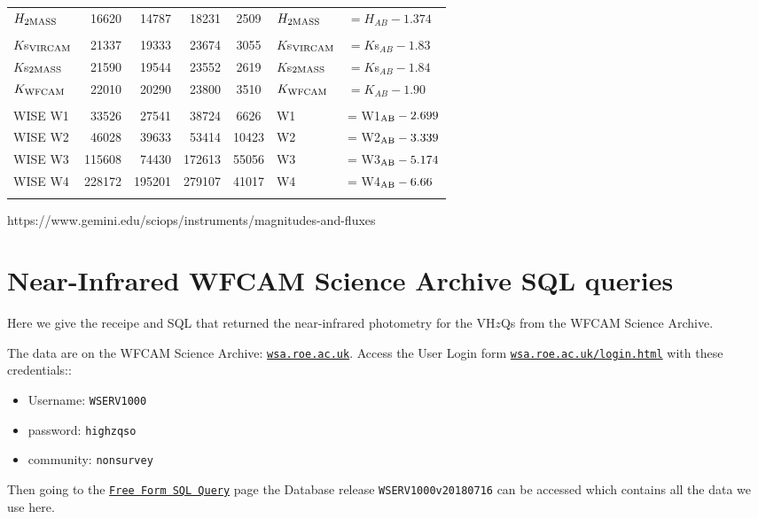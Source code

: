 \documentclass[usenatbib]{mnras}
\begin{document}
\begin{table*}
\begin{center}
\begin{tabular}{l r r r  c l l}
      $H_{\rm 2MASS}$      & 16620        & 	14787  &   18231   & 2509      & $H_{\rm 2MASS}$      & $= H_{AB}  - 1.374 $        \\
      &&&&&&\\
      $K$s$_{\rm VIRCAM}$     &    21337    &    19333  &    23674   &   3055     & $K$s$_{\rm VIRCAM}$      & $ = K$s$_{AB} - 1.83  $          \\ 
      $K$s$_{\rm 2MASS}$     &   21590    & 	19544  &   23552        &   2619      & $K$s$_{\rm 2MASS}$      & $ = K$s$_{AB} -  1.84  $          \\ 
      $K_{\rm WFCAM}$     &    22010     &    20290 &    23800         &   3510          & $K_{\rm WFCAM}$     & $ = K_{AB} - 1.90  $          \\ 
      &&&&&&\\
      WISE W1               &    33526    &    27541  &    38724   &    6626    & W1                        &   = W1$_{\rm AB} - 2.699$ \\
      WISE W2               &    46028    &    39633  &    53414   &  10423    & W2                        &   = W2$_{\rm AB} - 3.339$ \\
      WISE W3               &  115608    &    74430  &  172613   &  55056    & W3                        &   = W3$_{\rm AB} - 5.174$ \\
      WISE W4               &  228172    &  195201  &  279107   &  41017    & W4                        &   = W4$_{\rm AB} - 6.66$ \\
      \hline
      \hline
      \label{tab:filter_details}
    \end{tabular}
     \end{center}
\end{table*}
https://www.gemini.edu/sciops/instruments/magnitudes-and-fluxes


\section{Near-Infrared WFCAM Science Archive SQL queries}\label{sec:SQL}
Here we give the receipe and SQL that returned the near-infrared photometry 
for the VH$z$Qs from the  WFCAM Science Archive. 

The data are on the WFCAM Science Archive: \href{wsa.roe.ac.uk}{\tt wsa.roe.ac.uk}. 
Access the User Login form \href{WFCAM Science Archive}{\tt wsa.roe.ac.uk/login.html} 
with these credentials::
\begin{itemize}
    \item Username: {\tt WSERV1000} 
    \item password: {\tt highzqso} 
    \item community: {\tt nonsurvey}
\end{itemize}
Then going to the
\href{http://wsa.roe.ac.uk:8080/wsa/SQL_form.jsp}{{\tt Free Form SQL
Query}} page the Database release {\tt WSERV1000v20180716} can be
accessed which contains all the data we use here.
\end{document}
